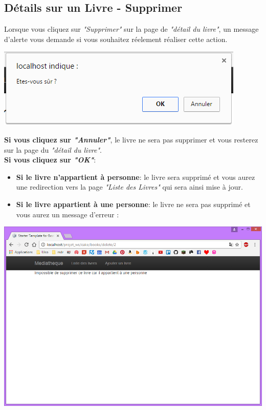 \documentclass{report}
\begin{document}
			\subsection{D\'{e}tails sur un Livre - Supprimer}
			Lorsque vous cliquez sur \textit{"Supprimer"} sur la page de \textit{"d\'{e}tail du livre"}, un message d'alerte vous demande si vous souhaitez r\'{e}element r\'{e}aliser cette action.
			\begin{center}
				\includegraphics[scale=0.4]{img/manuel/DetailLivre_Supprimer.png}  
			\end{center}
			\textbf{Si vous cliquez sur \textit{"Annuler"}}, le livre ne sera pas supprimer et vous resterez sur la page du \textit{"d\'{e}tail du livre"}.\\
			\textbf{Si vous cliquez sur \textit{"OK"}}: 
			\begin{itemize}
			 \item \textbf{Si le livre n'appartient \`{a} personne}: le livre sera supprim\'{e} et vous aurez une redirection vers la page \textit{"Liste des Livres"} qui sera ainsi mise \`{a} jour. 
			 \item \textbf{Si le livre appartient \`{a} une personne}: le livre ne sera pas supprim\'{e} et vous aurez un message d'erreur : 
			\end{itemize} 
			
			\begin{center}
				\includegraphics[scale=0.4]{img/manuel/DetailLivre_Supprimer_error.png}  
			\end{center}
			
\end{document}
